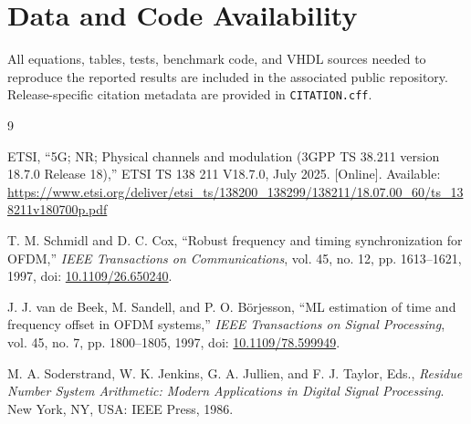 \documentclass[11pt]{article}
\begin{document}
\section*{Data and Code Availability}

All equations, tables, tests, benchmark code, and VHDL sources needed to reproduce the reported results are included in the associated public repository.  Release-specific citation metadata are provided in \texttt{CITATION.cff}.

\begin{thebibliography}{9}

ETSI, ``5G; NR; Physical channels and modulation (3GPP TS 38.211 version 18.7.0 Release 18),'' ETSI TS 138 211 V18.7.0, July 2025. [Online]. Available: \url{https://www.etsi.org/deliver/etsi_ts/138200_138299/138211/18.07.00_60/ts_138211v180700p.pdf}

T. M. Schmidl and D. C. Cox, ``Robust frequency and timing synchronization for OFDM,'' \emph{IEEE Transactions on Communications}, vol. 45, no. 12, pp. 1613--1621, 1997, doi: \href{https://doi.org/10.1109/26.650240}{10.1109/26.650240}.

J. J. van de Beek, M. Sandell, and P. O. B\"orjesson, ``ML estimation of time and frequency offset in OFDM systems,'' \emph{IEEE Transactions on Signal Processing}, vol. 45, no. 7, pp. 1800--1805, 1997, doi: \href{https://doi.org/10.1109/78.599949}{10.1109/78.599949}.

M. A. Soderstrand, W. K. Jenkins, G. A. Jullien, and F. J. Taylor, Eds., \emph{Residue Number System Arithmetic: Modern Applications in Digital Signal Processing}. New York, NY, USA: IEEE Press, 1986.

\end{thebibliography}
\end{document}
